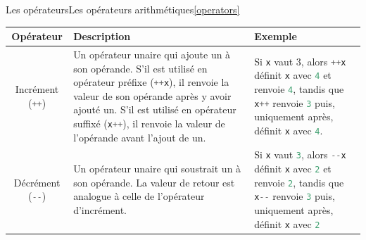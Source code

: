 \documentclass{beamer}
\begin{document}
    \begin{frame}{Les opérateurs}{Les opérateurs arithmétiques\cref{operators}}
        \begin{tiny}
            \begin{table}[h!]
                \centering
                \begin{tabular}{|c|p{4cm}|p{4cm}|}
                    \hline
                    \textbf{Opérateur}                                               & \textbf{Description}                                                                                                                                                                                                                                                                                                                & \textbf{Exemple}                                                                                                                                                                                                                                                                                                                                                                                                                                                  \\
                    \hline
                    Incrément (\lstinline[language=Javascript]!++!)                  & Un opérateur unaire qui ajoute un à son opérande. S'il est utilisé en opérateur préfixe (\lstinline[language=Javascript]!++x!), il renvoie la valeur de son opérande après y avoir ajouté un. S'il est utilisé en opérateur suffixé (\lstinline[language=Javascript]!x++!), il renvoie la valeur de l'opérande avant l'ajout de un. & Si \lstinline[language=Javascript]!x! vaut 3, alors \lstinline[language=Javascript]!++x! définit \lstinline[language=Javascript]!x! avec \lstinline[language=Javascript]!4! et renvoie \lstinline[language=Javascript]!4!, tandis que \lstinline[language=Javascript]!x++! renvoie \lstinline[language=Javascript]!3! puis, uniquement après, définit \lstinline[language=Javascript]!x! avec \lstinline[language=Javascript]!4!.                                 \\
                    \hline
                    Décrément (\lstinline[language=Javascript]!--!)                  & Un opérateur unaire qui soustrait un à son opérande. La valeur de retour est analogue à celle de l'opérateur d'incrément.                                                                                                                                                                                                           & Si \lstinline[language=Javascript]!x! vaut \lstinline[language=Javascript]!3!, alors \lstinline[language=Javascript]!--x! définit \lstinline[language=Javascript]!x! avec \lstinline[language=Javascript]!2! et renvoie \lstinline[language=Javascript]!2!, tandis que \lstinline[language=Javascript]!x--! renvoie \lstinline[language=Javascript]!3! puis, uniquement après, définit \lstinline[language=Javascript]!x! avec \lstinline[language=Javascript]!2! \\

\end{tabular}
\end{table}
\end{tiny}
\end{frame}
\end{document}
